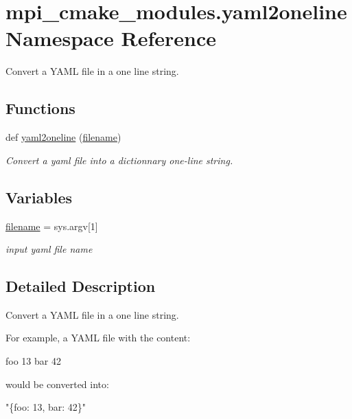 \hypertarget{namespacempi__cmake__modules_1_1yaml2oneline}{}\section{mpi\+\_\+cmake\+\_\+modules.\+yaml2oneline Namespace Reference}
\label{namespacempi__cmake__modules_1_1yaml2oneline}


Convert a Y\+A\+ML file in a one line string.  


\subsection*{Functions}
\begin{DoxyCompactItemize}
\item 
def \hyperlink{namespacempi__cmake__modules_1_1yaml2oneline_a82021b35eab75040f7372ecfd4f21b0d}{yaml2oneline} (\hyperlink{namespacempi__cmake__modules_1_1yaml2oneline_ac27969d1fd9b275701d6a253c87c6eb1}{filename})
\begin{DoxyCompactList}\small\item\em Convert a yaml file into a dictionnary one-\/line string. \end{DoxyCompactList}\end{DoxyCompactItemize}
\subsection*{Variables}
\begin{DoxyCompactItemize}
\item 
\mbox{\label{namespacempi__cmake__modules_1_1yaml2oneline_ac27969d1fd9b275701d6a253c87c6eb1}} 
\hyperlink{namespacempi__cmake__modules_1_1yaml2oneline_ac27969d1fd9b275701d6a253c87c6eb1}{filename} = sys.\+argv\mbox{[}1\mbox{]}
\begin{DoxyCompactList}\small\item\em input yaml file name \end{DoxyCompactList}\end{DoxyCompactItemize}


\subsection{Detailed Description}
Convert a Y\+A\+ML file in a one line string. 

For example, a Y\+A\+ML file with the content\+: 
\begin{DoxyCode}
foo 13
bar 42
\end{DoxyCode}
 would be converted into\+:
\begin{DoxyCode}
\textcolor{stringliteral}{"\{foo: 13, bar: 42\}"} 
\end{DoxyCode}
 

